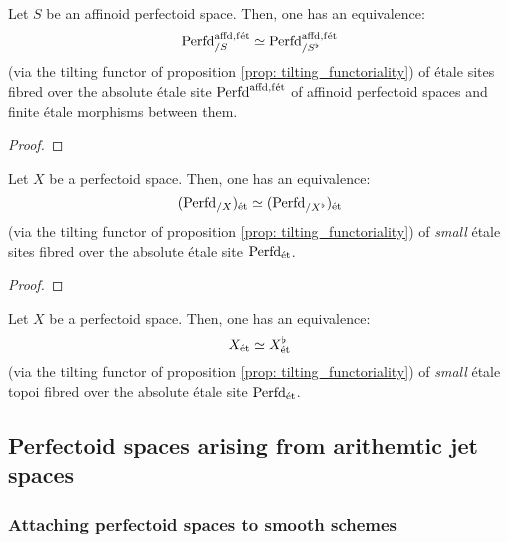                 \begin{lemma} \label{lemma: the_affinoid_tilting_equivalence}
                    Let $S$ be an affinoid perfectoid space. Then, one has an equivalence:
                        $$\mathrm{Perfd}^{\mathrm{affd}, \mathrm{f\acute{e}t}}_{/S} \simeq \mathrm{Perfd}^{\mathrm{affd}, \mathrm{f\acute{e}t}}_{/S^{\flat}}$$
                    (via the tilting functor of proposition \ref{prop: tilting_functoriality}) of \'etale sites fibred over the absolute \'etale site $\mathrm{Perfd}^{\mathrm{affd}, \mathrm{f\acute{e}t}}$ of affinoid perfectoid spaces and finite \'etale morphisms between them.
                \end{lemma}
                    \begin{proof}
                        
                    \end{proof}
                \begin{theorem} \label{theorem: the_tilting_equivalence}
                    Let $X$ be a perfectoid space. Then, one has an equivalence:
                        $$(\mathrm{Perfd}_{/X})_{\mathrm{\acute{e}t}} \simeq (\mathrm{Perfd}_{/X^{\flat}})_{\mathrm{\acute{e}t}}$$
                    (via the tilting functor of proposition \ref{prop: tilting_functoriality}) of \textit{small} \'etale sites fibred over the absolute \'etale site $\mathrm{Perfd}_{\mathrm{\acute{e}t}}$.
                \end{theorem}
                    \begin{proof}
                        
                    \end{proof}
                \begin{corollary}
                    Let $X$ be a perfectoid space. Then, one has an equivalence:
                        $$X_{\mathrm{\acute{e}t}} \simeq X^{\flat}_{\mathrm{\acute{e}t}}$$
                    (via the tilting functor of proposition \ref{prop: tilting_functoriality}) of \textit{small} \'etale topoi fibred over the absolute \'etale site $\mathrm{Perfd}_{\mathrm{\acute{e}t}}$. 
                \end{corollary}
                    
        \subsection{Perfectoid spaces arising from arithemtic jet spaces}
                
            \subsubsection{Attaching perfectoid spaces to smooth schemes}
                
